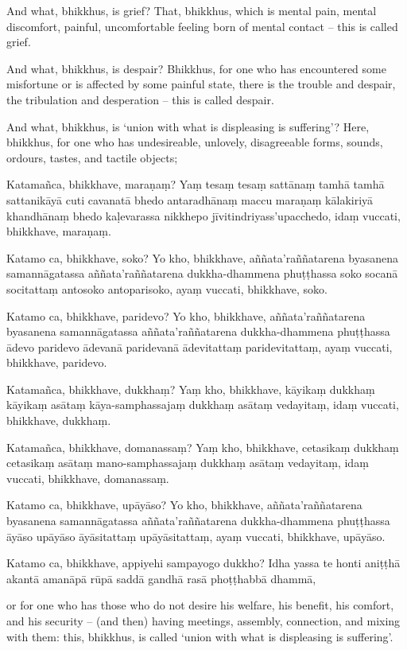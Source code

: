 And what, bhikkhus, is grief? That, bhikkhus, which is mental pain, mental
discomfort, painful, uncomfortable feeling born of mental contact -- this is
called grief.

And what, bhikkhus, is despair? Bhikkhus, for one who has encountered some
misfortune or is affected by some painful state, there is the trouble and
despair, the tribulation and desperation -- this is called despair.

And what, bhikkhus, is `union with what is displeasing is suffering'? Here,
bhikkhus, for one who has undesireable, unlovely, disagreeable forms, sounds,
ordours, tastes, and tactile objects;

\paliPage

Katamañca, bhikkhave, maraṇaṃ? Yaṃ tesaṃ tesaṃ sattānaṃ tamhā tamhā sattanikāyā
cuti cavanatā bhedo antaradhānaṃ maccu maraṇaṃ kālakiriyā khandhānaṃ bhedo
kaḷevarassa nikkhepo jīvitindriyass'upacchedo, idaṃ vuccati, bhikkhave, maraṇaṃ.

Katamo ca, bhikkhave, soko? Yo kho, bhikkhave, aññata'raññatarena byasanena
samannāgatassa aññata'raññatarena dukkha-dhammena phuṭṭhassa soko socanā
socitattaṃ antosoko antoparisoko, ayaṃ vuccati, bhikkhave, soko.

Katamo ca, bhikkhave, paridevo? Yo kho, bhikkhave, aññata'raññatarena
byasanena samannāgatassa aññata'raññatarena dukkha-dhammena phuṭṭhassa
ādevo paridevo ādevanā paridevanā ādevitattaṃ paridevitattaṃ, ayaṃ
vuccati, bhikkhave, paridevo.

Katamañca, bhikkhave, dukkhaṃ? Yaṃ kho, bhikkhave, kāyikaṃ dukkhaṃ kāyikaṃ
asātaṃ kāya-samphassajaṃ dukkhaṃ asātaṃ vedayitaṃ, idaṃ vuccati, bhikkhave,
dukkhaṃ.

Katamañca, bhikkhave, domanassaṃ? Yaṃ kho, bhikkhave, cetasikaṃ dukkhaṃ
cetasikaṃ asātaṃ mano-samphassajaṃ dukkhaṃ asātaṃ vedayitaṃ, idaṃ vuccati,
bhikkhave, domanassaṃ.

Katamo ca, bhikkhave, upāyāso? Yo kho, bhikkhave, aññata'raññatarena byasanena
samannāgatassa aññata'raññatarena dukkha-dhammena phuṭṭhassa āyāso upāyāso
āyāsitattaṃ upāyāsitattaṃ, ayaṃ vuccati, bhikkhave, upāyāso.

Katamo ca, bhikkhave, appiyehi sampayogo dukkho? Idha yassa te honti aniṭṭhā
akantā amanāpā rūpā saddā gandhā rasā phoṭṭhabbā dhammā,

\englishPage

or for one who has those who do not desire his welfare, his benefit, his
comfort, and his security -- (and then) having meetings, assembly, connection,
and mixing with them: this, bhikkhus, is called `union with what is displeasing
is suffering'.

